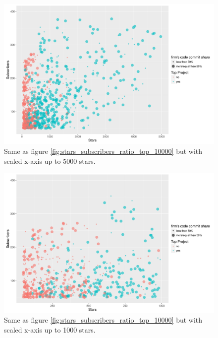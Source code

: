 \begin{landscape}
\begin{figure}
	\centering
	\includegraphics[page=1,scale=0.4]{../graphics/intro/stars_subscribers_ratio_top_5000.pdf}
	\caption{Same as figure \ref{fig:stars_subscribers_ratio_top_10000} but with scaled x-axis up to 5000 stars.}
	\label{fig:stars_subscribers_ratio_top_5000}
\end{figure}

\begin{figure}
	\centering
	\includegraphics[page=1,scale=0.4]{../graphics/intro/stars_subscribers_ratio_top_1000.pdf}
	\caption{Same as figure \ref{fig:stars_subscribers_ratio_top_10000} but with scaled x-axis up to 1000 stars.}
	\label{fig:stars_subscribers_ratio_top_1000}
\end{figure}

\end{landscape}







